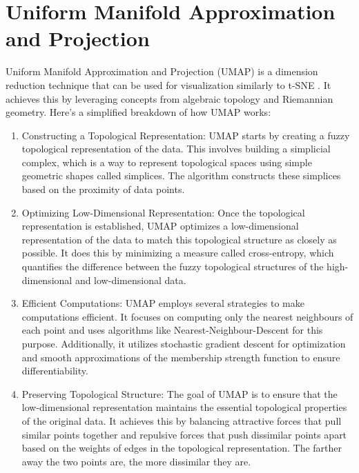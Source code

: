 \section{Uniform Manifold Approximation and Projection} \label{chap-2:umap}
Uniform Manifold Approximation and Projection (UMAP) is a dimension reduction technique that can be used for visualization similarly to t-SNE \cite{https://doi.org/10.48550/arxiv.1802.03426}. It achieves this by leveraging concepts from algebraic topology and Riemannian geometry.
Here's a simplified breakdown of how UMAP works:
\begin{enumerate}
\item Constructing a Topological Representation: UMAP starts by creating a fuzzy topological representation of the data. This involves building a simplicial complex, which is a way to represent topological spaces using simple geometric shapes called simplices. The algorithm constructs these simplices based on the proximity of data points.
\item Optimizing Low-Dimensional Representation: Once the topological representation is established, UMAP optimizes a low-dimensional representation of the data to match this topological structure as closely as possible. It does this by minimizing a measure called cross-entropy, which quantifies the difference between the fuzzy topological structures of the high-dimensional and low-dimensional data.
\item Efficient Computations: UMAP employs several strategies to make computations efficient. It focuses on computing only the nearest neighbours of each point and uses algorithms like Nearest-Neighbour-Descent for this purpose. Additionally, it utilizes stochastic gradient descent for optimization and smooth approximations of the membership strength function to ensure differentiability.
\item Preserving Topological Structure: The goal of UMAP is to ensure that the low-dimensional representation maintains the essential topological properties of the original data. It achieves this by balancing attractive forces that pull similar points together and repulsive forces that push dissimilar points apart based on the weights of edges in the topological representation. The farther away the two points are, the more dissimilar they are. 
\end{enumerate}
